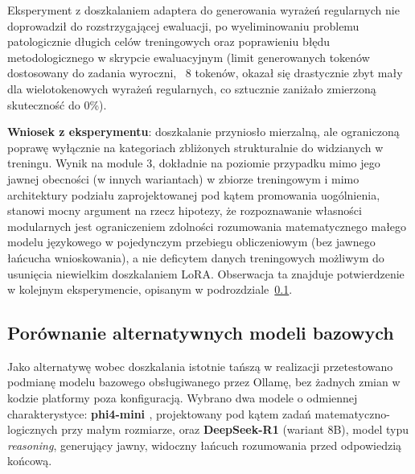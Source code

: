 \documentclass[12pt]{article}
\begin{document}
Eksperyment z doszkalaniem adaptera do generowania wyrażeń regularnych nie doprowadził do rozstrzygającej ewaluacji, po wyeliminowaniu problemu patologicznie długich celów treningowych oraz poprawieniu błędu metodologicznego w skrypcie ewaluacyjnym (limit generowanych tokenów dostosowany do zadania wyroczni, ~8 tokenów, okazał się drastycznie zbyt mały dla wielotokenowych wyrażeń regularnych, co sztucznie zaniżało zmierzoną skuteczność do 0\%).

\textbf{Wniosek z eksperymentu}: doszkalanie przyniosło mierzalną, ale ograniczoną poprawę wyłącznie na kategoriach zbliżonych strukturalnie do widzianych w treningu. Wynik na module 3, dokładnie na poziomie przypadku mimo jego jawnej obecności (w innych wariantach) w zbiorze treningowym i mimo architektury podziału zaprojektowanej pod kątem promowania uogólnienia, stanowi mocny argument na rzecz hipotezy, że rozpoznawanie własności modularnych jest ograniczeniem zdolności rozumowania matematycznego małego modelu językowego w pojedynczym przebiegu obliczeniowym (bez jawnego łańcucha wnioskowania), a nie deficytem danych treningowych możliwym do usunięcia niewielkim doszkalaniem LoRA. Obserwacja ta znajduje potwierdzenie w kolejnym eksperymencie, opisanym w podrozdziale~\ref{subsec:modele}.

\subsection{Porównanie alternatywnych modeli bazowych}
\label{subsec:modele} \cite{jiang2023,abdin2024,deepseek2025}

Jako alternatywę wobec doszkalania istotnie tańszą w realizacji przetestowano podmianę modelu bazowego obsługiwanego przez Ollamę, bez żadnych zmian w kodzie platformy poza konfiguracją. Wybrano dwa modele o odmiennej charakterystyce: \textbf{phi4-mini \cite{abdin2024}}, projektowany pod kątem zadań matematyczno-logicznych przy małym rozmiarze, oraz \textbf{DeepSeek-R1} (wariant 8B), model typu \emph{reasoning}, generujący jawny, widoczny łańcuch rozumowania przed odpowiedzią końcową.
\end{document}

